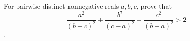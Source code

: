 For pairwise distinct nonnegative reals $a,b,c$,  prove that$$\frac{a^2}{(b-c)^2}+\frac{b^2}{(c-a)^2}+\frac{c^2}{(b-a)^2}>2$$.